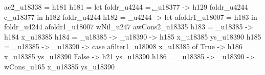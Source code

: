                                                                                                                                     ac2_u18338 = h181
                                                                                                                                    h181 = let
                                                                                                                                             foldr_u4244 = \c_u18377 -> h129 foldr_u4244 c_u18377
                                                                                                                                           in h182 foldr_u4244
                                                                                                                                    h182 = \foldr_u4244 -> let
                                                                                                                                                             afoldr1_u18007 = h183
                                                                                                                                                           in foldr_u4244 afoldr1_u18007 wNil_u247 awCons2_u18335
                                                                                                                                    h183 = \x_u18385 -> h184 x_u18385
                                                                                                                                    h184 = \x_u18385 -> \ys_u18390 -> h185 x_u18385 ys_u18390
                                                                                                                                    h185 = \x_u18385 -> \ys_u18390 -> case afilter1_u18008 x_u18385 of
                                                                                                                                                                        True ->
                                                                                                                                                                          h186 x_u18385 ys_u18390
                                                                                                                                                                        False ->
                                                                                                                                                                          h21 ys_u18390
                                                                                                                                    h186 = \x_u18385 -> \ys_u18390 -> wCons_u165 x_u18385 ys_u18390
